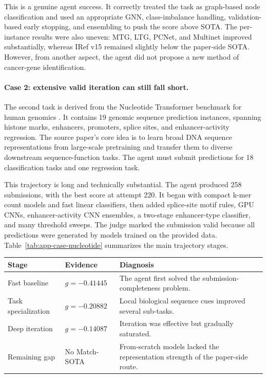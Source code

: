 \documentclass{llmxive}
\begin{document}
This is a genuine agent success. It correctly treated the task as graph-based node classification and used an appropriate GNN, class-imbalance handling, validation-based early stopping, and ensembling to push the score above SOTA. The per-instance results were also uneven: MTG, LTG, PCNet, and Multinet improved substantially, whereas IRef v15 remained slightly below the paper-side SOTA. However, from another aspect, the agent did not propose a new method of cancer-gene identification.

\paragraph{Case 2: extensive valid iteration can still fall short.}
The second task is derived from the Nucleotide Transformer benchmark for human genomics \citep{dallatorre2025nucleotide}. It contains 19 genomic sequence prediction instances, spanning histone marks, enhancers, promoters, splice sites, and enhancer-activity regression. The source paper's core idea is to learn broad DNA sequence representations from large-scale pretraining and transfer them to diverse downstream sequence-function tasks. The agent must submit predictions for 18 classification tasks and one regression task.

This trajectory is long and technically substantial. The agent produced 258 submissions, with the best score at attempt 220. It began with compact k-mer count models and fast linear classifiers, then added splice-site motif rules, GPU CNNs, enhancer-activity CNN ensembles, a two-stage enhancer-type classifier, and many threshold sweeps. The judge marked the submission valid because all predictions were generated by models trained on the provided data.
Table~\ref{tab:app-case-nucleotide} summarizes the main trajectory stages.

\begin{center}
\begin{minipage}{\textwidth}
\label{tab:app-case-nucleotide}
\centering
\small
\begin{tabular}{@{}p{}p{}p{}@{}}
\toprule
Stage & Evidence & Diagnosis \\
\midrule
Fast baseline & $g=-0.41445$ & The agent first solved the submission-completeness problem. \\
Task specialization & $g=-0.20882$ & Local biological sequence cues improved several sub-tasks. \\
Deep iteration & $g=-0.14087$ & Iteration was effective but gradually saturated. \\
Remaining gap & No Match-SOTA & From-scratch models lacked the representation strength of the paper-side route. \\
\bottomrule
\end{tabular}
\end{minipage}
\end{center}
\end{document}

